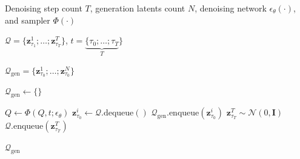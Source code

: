 \documentclass{article}
\theoremstyle{plain}
\theoremstyle{definition}
\theoremstyle{remark}
\begin{document}
\begin{algorithm}[htbp]
\caption{Frame-level autoregressive generation in FIFO-Diffusion}
\label{alg:fifo_auto_gen}
\begin{algorithmic}[1]

 Denoising step count $T$, generation latents count $N$, 
denoising network $\epsilon_{\theta}(\cdot)$, and sampler $\Phi(\cdot)$

$\mathcal{Q}=\{\mathbf{z}_{\tau_1}^1; \dots; \mathbf{z}_{\tau_T}^T\}$,
$t=\underbrace{\{\tau_{0}; \dots; \tau_{T}}_{T}\}$

$\mathcal{Q}_\mathrm{gen}=\{\mathbf{z}_{\tau_0}^1; \dots; \mathbf{z}_{\tau_0}^N\}$

\STATE $\mathcal{Q}_\mathrm{gen} \gets \{\}$

\STATE {\bfseries \textcolor{blue}{\# Frame-level autoregressive generation}}

    \STATE $Q \gets \Phi(Q, t; \epsilon_{\theta})$
    \STATE $\mathbf{z}_{\tau_0}^i \gets \mathcal{Q}.\text{dequeue}()$
    \STATE $\mathcal{Q}_\mathrm{gen}.\text{enqueue}(\mathbf{z}_{\tau_0}^i)$
    \STATE $\mathbf{z}_{\tau_T}^T \sim \mathcal{N}(0, \mathbf{I})$
    \STATE $\mathcal{Q}.\text{enqueue}(\mathbf{z}_{\tau_T}^T)$
\ENDFOR

 $\mathcal{Q}_\mathrm{gen}$

\end{algorithmic}
\end{algorithm}
\end{document}
